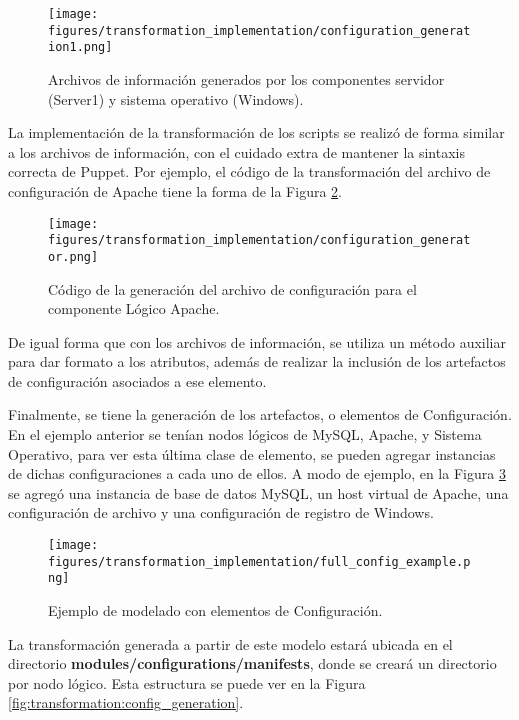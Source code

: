 \begin{figure}[htbp]
    \centering
    \texttt{[image: figures/transformation\_implementation/configuration\_generation1.png]}
    \caption{Archivos de información generados por los componentes servidor (Server1) y sistema operativo (Windows).}
    \label{fig:transformation:configuration_generated_1}
\end{figure}

La implementación de la transformación de los scripts se realizó de forma similar a los archivos de información, con el cuidado extra de mantener la sintaxis correcta de Puppet. Por ejemplo, el código de la transformación del archivo de configuración de Apache tiene la forma de la Figura \ref{fig:transformation:configuration_generator}.

\begin{figure}[htbp]
    \centering
    \texttt{[image: figures/transformation\_implementation/configuration\_generator.png]}
    \caption{Código de la generación del archivo de configuración para el componente Lógico Apache.}
    \label{fig:transformation:configuration_generator}
\end{figure}

De igual forma que con los archivos de información, se utiliza un método auxiliar para dar formato a los atributos, además de realizar la inclusión de los artefactos de configuración asociados a ese elemento. 

Finalmente, se tiene la generación de los artefactos, o elementos de Configuración. En el ejemplo anterior se tenían nodos lógicos de MySQL, Apache, y Sistema Operativo, para ver esta última clase de elemento, se pueden agregar instancias de dichas configuraciones a cada uno de ellos. A modo de ejemplo, en la Figura \ref{fig:transformation:config_example} se agregó una instancia de base de datos MySQL, un host virtual de Apache, una configuración de archivo y una configuración de registro de Windows.

\begin{figure}[htbp]
    \centering
    \texttt{[image: figures/transformation\_implementation/full\_config\_example.png]}
    \caption{Ejemplo de modelado con elementos de Configuración.}
    \label{fig:transformation:config_example}
\end{figure}

La transformación generada a partir de este modelo estará ubicada en el directorio \textbf{modules/configurations/manifests}, donde se creará un directorio por nodo lógico. Esta estructura se puede ver en la Figura \ref{fig:transformation:config_generation}.


